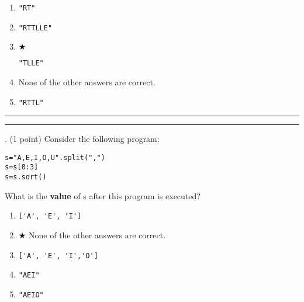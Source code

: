 \documentclass{article}
\begin{document}
\begin{enumerate}
\item[(A)]
\begin{verbatim}"RT"\end{verbatim}

\item[(B)]
\begin{verbatim}"RTTLLE"\end{verbatim}

\item[(C)] $\bigstar$ 
\begin{verbatim}"TLLE"\end{verbatim}

\item[(D)]
None of the other answers are correct.

\item[(E)]
\begin{verbatim}"RTTL"\end{verbatim}

\end{enumerate}

\vspace*{2em}
\hrule
\vspace{2em}

\vspace{2em}
\hrule height 2pt


\newpage
{}. (1 point)
Consider the following program:
\begin{verbatim}
s="A,E,I,O,U".split(",")
s=s[0:3]
s=s.sort()
\end{verbatim}
What is the \textbf{value} of s after this program is executed?


\begin{enumerate}
\item[(A)]
\begin{verbatim}['A', 'E', 'I']\end{verbatim}

\item[(B)] $\bigstar$ 
None of the other answers are correct.

\item[(C)]
\begin{verbatim}['A', 'E', 'I','O']\end{verbatim}

\item[(D)]
\begin{verbatim}"AEI"\end{verbatim}

\item[(E)]
\begin{verbatim}"AEIO"\end{verbatim}

\end{enumerate}
\end{document}

